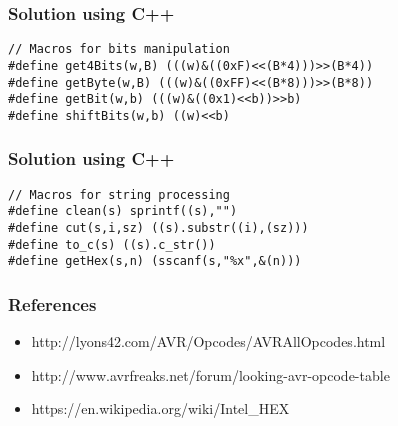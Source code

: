 \documentclass{beamer}
\begin{document}
\begin{frame}[fragile]
\frametitle{ Solution using C++ }
\begin{example}[ C++ Implementation ]
\begin{lstlisting}
// Macros for bits manipulation
#define get4Bits(w,B) (((w)&((0xF)<<(B*4)))>>(B*4))
#define getByte(w,B) (((w)&((0xFF)<<(B*8)))>>(B*8))
#define getBit(w,b) (((w)&((0x1)<<b))>>b)
#define shiftBits(w,b) ((w)<<b)
\end{lstlisting}
\end{example}
\end{frame}
\begin{frame}[fragile]
\frametitle{ Solution using C++ }
\begin{example}[ C++ Implementation ]
\begin{lstlisting}
// Macros for string processing
#define clean(s) sprintf((s),"")
#define cut(s,i,sz) ((s).substr((i),(sz)))
#define to_c(s) ((s).c_str())
#define getHex(s,n) (sscanf(s,"%x",&(n)))
\end{lstlisting}
\end{example}
\end{frame}
\begin{frame}
\frametitle{ References }
\begin{itemize}
	\item http://lyons42.com/AVR/Opcodes/AVRAllOpcodes.html
	\item http://www.avrfreaks.net/forum/looking-avr-opcode-table
	\item https://en.wikipedia.org/wiki/Intel\_HEX
\end{itemize}
\end{frame}
\end{document}
